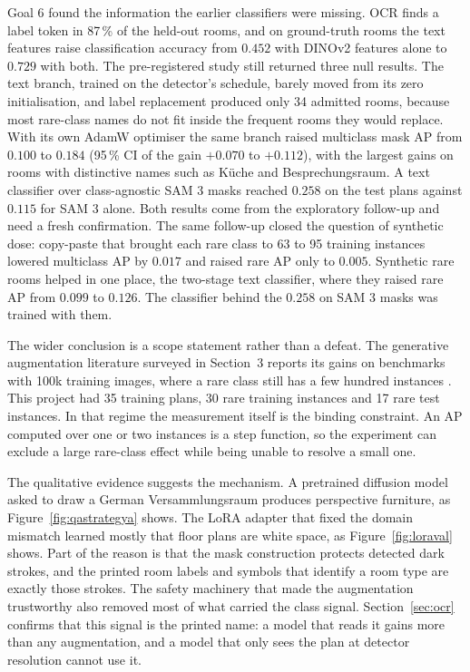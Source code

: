 Goal 6 found the information the earlier classifiers were missing. OCR finds a
label token in 87\,\% of the held-out rooms, and on ground-truth rooms the
text features raise classification accuracy from $0.452$ with DINOv2 features
alone to $0.729$ with both. The pre-registered study still returned three null
results. The text branch, trained on the detector's schedule, barely moved from
its zero initialisation, and label replacement produced only 34 admitted rooms,
because most rare-class names do not fit inside the frequent rooms they would
replace. With its own AdamW optimiser the same branch raised multiclass mask AP
from $0.100$ to $0.184$ (95\,\% CI of the gain $+0.070$ to $+0.112$), with
the largest gains on rooms with distinctive names such as K\"uche and
Besprechungsraum. A text classifier
over class-agnostic SAM 3 masks reached $0.258$ on the test plans against
$0.115$ for SAM 3 alone. Both results come from the exploratory follow-up and
need a fresh confirmation. The same follow-up closed the question of synthetic
dose: copy-paste that brought each rare class to 63 to 95 training instances
lowered multiclass AP by $0.017$ and raised rare AP only to $0.005$. Synthetic
rare rooms helped in one place, the two-stage text classifier, where they
raised rare AP from $0.099$ to $0.126$. The classifier behind the $0.258$ on
SAM 3 masks was trained with them.

The wider conclusion is a scope statement rather than a defeat. The generative
augmentation literature surveyed in Section~3 reports its gains on benchmarks
with 100k training images, where a rare class still has a few hundred instances
\cite{gupta2019lvis,xie2024mosaicfusion,shin2023fillup}. This project had 35
training plans, 30 rare training instances and 17 rare test instances. In that
regime the measurement itself is the binding constraint. An AP computed over one
or two instances is a step function, so the experiment can exclude a large
rare-class effect while being unable to resolve a small one.

The qualitative evidence suggests the mechanism. A pretrained diffusion model
asked to draw a German Versammlungsraum produces perspective furniture, as
Figure~\ref{fig:qastrategya} shows. The LoRA adapter that fixed the domain
mismatch learned mostly that floor plans are white space, as
Figure~\ref{fig:loraval} shows. Part of the reason is that the mask construction
protects detected dark strokes, and the printed room labels and symbols that
identify a room type are exactly those strokes. The safety machinery that made
the augmentation trustworthy also removed most of what carried the class signal.
Section~\ref{sec:ocr} confirms that this signal is the printed name: a model
that reads it gains more than any augmentation, and a model that only sees the
plan at detector resolution cannot use it.

